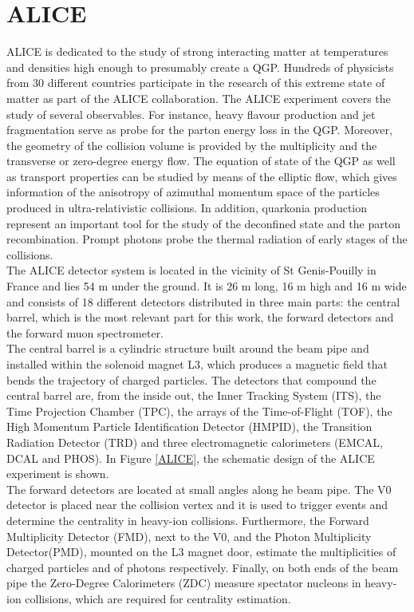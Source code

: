 \documentclass[12pt,a4paper]{report}
\begin{document}
\section{ALICE}
ALICE is dedicated to the study of strong interacting matter at temperatures and densities high enough to presumably create a QGP. Hundreds of physicists from 30 different countries participate in the research of this extreme state of matter as part of the ALICE collaboration. The ALICE experiment covers the study of several observables. For instance, heavy flavour production and jet fragmentation serve as probe for the parton energy loss in the QGP. Moreover, the geometry of the collision volume is provided by the multiplicity and the transverse or zero-degree energy flow. The equation of state of the QGP as well as transport properties can be studied by means of the elliptic flow, which gives information of the anisotropy of azimuthal momentum space of the particles produced in ultra-relativistic collisions. In addition, quarkonia production represent an important tool for the study of the deconfined state and the parton recombination. Prompt photons probe the thermal radiation of early stages of the collisions.\\
The ALICE detector system is located in the vicinity of St Genis-Pouilly in France and lies 54 m under the ground. It is 26 m long, 16 m high and 16 m wide and consists of 18 different detectors distributed in three main parts: the central barrel, which is the most relevant part for this work, the forward detectors and the forward muon spectrometer. \\
The central barrel is a cylindric structure built around the beam pipe and installed within the solenoid magnet L3, which produces a magnetic field that bends the trajectory of charged particles. The detectors that compound the central barrel are, from the inside out, the Inner Tracking System (ITS), the Time Projection Chamber (TPC), the arrays of the Time-of-Flight (TOF), the High Momentum Particle Identification Detector (HMPID), the Transition Radiation Detector (TRD) and three electromagnetic calorimeters (EMCAL, DCAL and PHOS). In Figure \ref{ALICE}, the schematic design of the ALICE experiment is shown. \\
The forward detectors are located at small angles along he beam pipe. The V0 detector is placed near the collision vertex and it is used to trigger events and determine the centrality in heavy-ion collisions. Furthermore, the Forward Multiplicity Detector (FMD), next to the V0, and the Photon Multiplicity Detector(PMD), mounted on the L3 magnet door, estimate the multiplicities of charged particles and of photons respectively. Finally, on both ends of the beam pipe the Zero-Degree Calorimeters (ZDC) measure spectator nucleons in heavy-ion collisions, which are required for centrality estimation. \\
\end{document}
